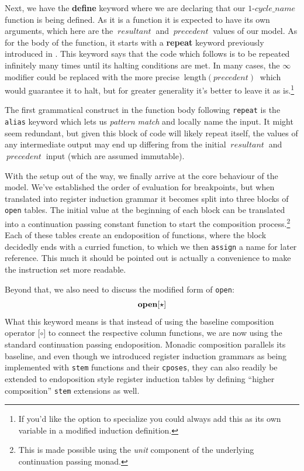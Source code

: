\documentclass[twoside]{article}
\newcommand{\strong}[1]{{\bfseries #1}}
\newcommand{\bfmbox}[1]{\mbox{\bfseries #1}}
\newcommand{\length}{\mbox{length}}
\begin{document}
Next, we have the \strong{define} keyword where we are declaring that our $ 1\mbox{-}cycle\_name $ function is being defined.
As it is a function it is expected to have its own arguments, which here are the $ \ resultant\ $ and $ \ precedent\ $ values
of our model. As for the body of the function, it starts with a \strong{repeat} keyword previously introduced in \cite{nikfi}.
This keyword says that the code which follows is to be repeated infinitely many times until its halting conditions are met.
In many cases, the $ \infty $ modifier could be replaced with the more precise $ \ \length(precedent)\ $ which would guarantee
it to halt, but for greater generality it's better to leave it as is.\footnote{If you'd like the option to specialize you could
always add this as its own variable in a modified induction definition.}

The first grammatical construct in the function body following \texttt{repeat} is the \texttt{alias} keyword which lets us
\emph{pattern match} and locally name the input. It might seem redundant, but given this block of code will likely repeat itself,
the values of any intermediate output may end up differing from the initial $ \ resultant\ $ and $ \ precedent\ $ input
(which are assumed immutable).

With the setup out of the way, we finally arrive at the core behaviour of the model. We've established the order of evaluation
for breakpoints, but when translated into register induction grammar it becomes split into three blocks of \texttt{open} tables.
The initial value at the beginning of each block can be translated into a continuation passing constant function to start the
composition process.\footnote{This is made possible using the \emph{unit} component of the underlying continuation passing monad.}
Each of these tables create an endoposition of functions, where the block decidedly ends with a curried function, to which we then
\texttt{assign} a name for later reference. This much it should be pointed out is actually a convenience to make the instruction
set more readable.

Beyond that, we also need to discuss the modified form of \texttt{open}:
$$ \bfmbox{open}[\star] $$
What this keyword means is that instead of using the baseline composition operator [$ \circ $] to connect the respective column
functions, we are now using the standard continuation passing endoposition. Monadic composition parallels its baseline, and even
though we introduced register induction grammars as being implemented with \texttt{stem} functions and their \texttt{cposes},
they can also readily be extended to endoposition style register induction tables by defining ``higher composition''
\texttt{stem} extensions as well.
\end{document}
